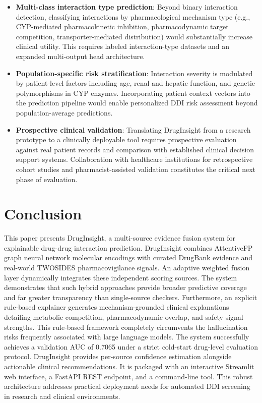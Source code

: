 \documentclass[conference]{IEEEtran}
\begin{document}
\begin{itemize}
    \item \textbf{Multi-class interaction type prediction}: Beyond binary interaction detection, classifying interactions by pharmacological mechanism type (e.g., CYP-mediated pharmacokinetic inhibition, pharmacodynamic target competition, transporter-mediated distribution) would substantially increase clinical utility. This requires labeled interaction-type datasets and an expanded multi-output head architecture.

    \item \textbf{Population-specific risk stratification}: Interaction severity is modulated by patient-level factors including age, renal and hepatic function, and genetic polymorphisms in CYP enzymes. Incorporating patient context vectors into the prediction pipeline would enable personalized DDI risk assessment beyond population-average predictions.

    \item \textbf{Prospective clinical validation}: Translating DrugInsight from a research prototype to a clinically deployable tool requires prospective evaluation against real patient records and comparison with established clinical decision support systems. Collaboration with healthcare institutions for retrospective cohort studies and pharmacist-assisted validation constitutes the critical next phase of evaluation.
\end{itemize}

\section{Conclusion}
This paper presents DrugInsight, a multi-source evidence fusion system for explainable drug-drug interaction prediction. DrugInsight combines AttentiveFP graph neural network molecular encodings with curated DrugBank evidence and real-world TWOSIDES pharmacovigilance signals. An adaptive weighted fusion layer dynamically integrates these independent scoring sources. The system demonstrates that such hybrid approaches provide broader predictive coverage and far greater transparency than single-source checkers. Furthermore, an explicit rule-based explainer generates mechanism-grounded clinical explanations detailing metabolic competition, pharmacodynamic overlap, and safety signal strengths. This rule-based framework completely circumvents the hallucination risks frequently associated with large language models. The system successfully achieves a validation AUC of 0.7065 under a strict cold-start drug-level evaluation protocol. DrugInsight provides per-source confidence estimation alongside actionable clinical recommendations. It is packaged with an interactive Streamlit web interface, a FastAPI REST endpoint, and a command-line tool. This robust architecture addresses practical deployment needs for automated DDI screening in research and clinical environments.
\end{document}
